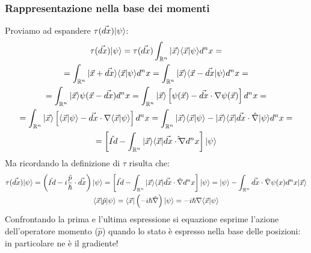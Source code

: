 \subsubsection*{Rappresentazione nella base dei momenti}
Proviamo ad espandere $\tau(\vec{dx})|\psi\rangle$:
\begin{gather*}
    \tau(\vec{dx})|\psi\rangle = \tau(\vec{dx}) \int_{\mathbb{R}^n} |\vec x \rangle \langle \vec x | \psi\rangle d^nx =\\
    = \int_{\mathbb{R}^n} |\vec x + \vec{dx} \rangle \langle \vec x | \psi\rangle d^nx =  \int_{\mathbb{R}^n} |\vec x \rangle \langle \vec x - \vec{dx} | \psi\rangle d^nx = \\
    = \int_{\mathbb{R}^n} |\vec x \rangle \psi(\vec x - \vec{dx}) d^nx = \int_{\mathbb{R}^n} |\vec x \rangle \left[ \psi(\vec x) - \vec{dx} \cdot \nabla \psi(\vec x) \right] d^nx = \\
    = \int_{\mathbb{R}^n} |\vec x \rangle \left[ \langle \vec x | \psi \rangle - \vec{dx} \cdot \nabla \langle \vec x | \psi \rangle \right] d^nx
    = \int_{\mathbb{R}^n} |\vec x\rangle \langle \vec x| \psi\rangle  - |\vec x \rangle \langle \vec x |  \vec{dx} \cdot \hat{\nabla} |\psi\rangle d^nx = \\
    = \left[\hat {Id} - \int_{\mathbb{R}^n} |\vec x\rangle \langle \vec x| \vec{dx} \cdot \hat \hat{\nabla} d^nx \right] | \psi \rangle
\end{gather*}
Ma ricordando la definizione di $\tau$ risulta che:
\begin{gather*}
    \tau(\vec{dx})| \psi \rangle = \left( \hat {Id} - i\frac{\hat p}{\hslash} \cdot \vec{dx}\right)| \psi \rangle = \left[\hat {Id} - \int_{\mathbb{R}^n} |\vec x\rangle \langle \vec x| \vec{dx} \cdot \hat {\nabla} d^nx \right] | \psi \rangle = | \psi \rangle - \int_{\mathbb{R}^n} \vec{dx} \cdot \hat {\nabla} \psi(x) d^nx | \vec x \rangle \\
    \langle \vec x | \hat p | \psi \rangle = \langle \vec x | \left( -i\hslash\hat{\nabla} \right) | \psi \rangle = -i\hslash\nabla \langle \vec x | \psi \rangle
\end{gather*}
Confrontando la prima e l'ultima espressione si equazione esprime l'azione dell'operatore momento ($\hat p$) quando lo stato è espresso nella base delle posizioni: in particolare ne è il gradiente!

